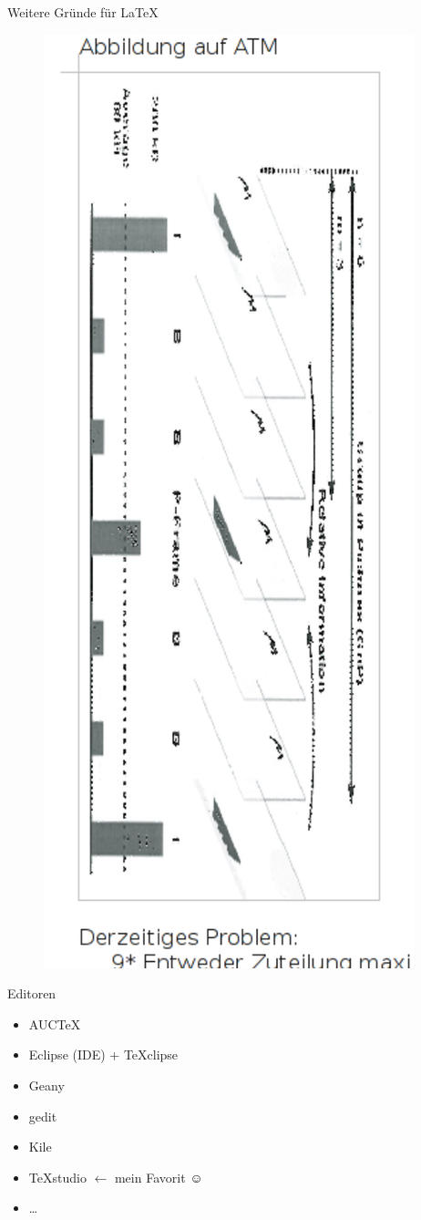 \begin{frame}{Weitere Gründe für \LaTeX}
\begin{figure}[tbph]
\centering
\includegraphics[height=0.75\textheight]{./pictures/hoeller3}
\label{fig:hoeller3}
\end{figure}
\end{frame}

\begin{frame}{Editoren}
 \begin{itemize}[<+->]
 	\item AUCTeX
 	\item Eclipse (IDE) + TeXclipse
 	\item Geany
 	\item gedit
 	\item Kile
 	\item TeXstudio $ \leftarrow $ mein Favorit $\smiley$
 	\item \ldots
 \end{itemize}

\end{frame}